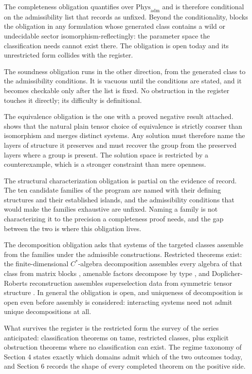 \documentclass[11pt,letterpaper]{article}
\theoremstyle{definition}
\theoremstyle{remark}
\begin{document}
The completeness obligation quantifies over $\mathrm{Phys}_{\mathrm{adm}}$ and is therefore conditional on the admissibility list that  records as unfixed. Beyond the conditionality,  blocks the obligation in any formulation whose generated class contains a wild or undecidable sector isomorphism-reflectingly: the parameter space the classification needs cannot exist there. The obligation is open today and its unrestricted form collides with the register.

The soundness obligation runs in the other direction, from the generated class to the admissibility conditions. It is vacuous until the conditions are stated, and it becomes checkable only after the list is fixed. No obstruction in the register touches it directly; its difficulty is definitional.

The equivalence obligation is the one with a proved negative result attached.  shows that the natural plain tensor choice of equivalence is strictly coarser than isomorphism and merges distinct systems. Any solution must therefore name the layers of structure it preserves and must recover the group from the preserved layers where a group is present. The solution space is restricted by a counterexample, which is a stronger constraint than mere openness.

The structural characterization obligation is partial on the evidence of record. The ten candidate families of the program are named with their defining structures and their established islands, and the admissibility conditions that would make the families exhaustive are unfixed. Naming a family is not characterizing it to the precision a completeness proof needs, and the gap between the two is where this obligation lives.

The decomposition obligation asks that systems of the targeted classes assemble from the families under the admissible constructions. Restricted theorems exist: the finite-dimensional $C^*$-algebra decomposition assembles every algebra of that class from matrix blocks \cite{cstarwiki}, amenable factors decompose by type \cite{vnwiki}, and Doplicher-Roberts reconstruction assembles superselection data from symmetric tensor structure \cite{eg2000}. In general the obligation is open, and uniqueness of decomposition is open even before assembly is considered: interacting systems need not admit unique decompositions at all.

What survives the register is the restricted form the survey of the series anticipated: classification theorems on tame, restricted classes, plus explicit obstruction theorems where no classification can exist. The regime taxonomy of Section 4 states exactly which domains admit which of the two outcomes today, and Section 6 records the shape of every completed theorem on the positive side.
\end{document}
